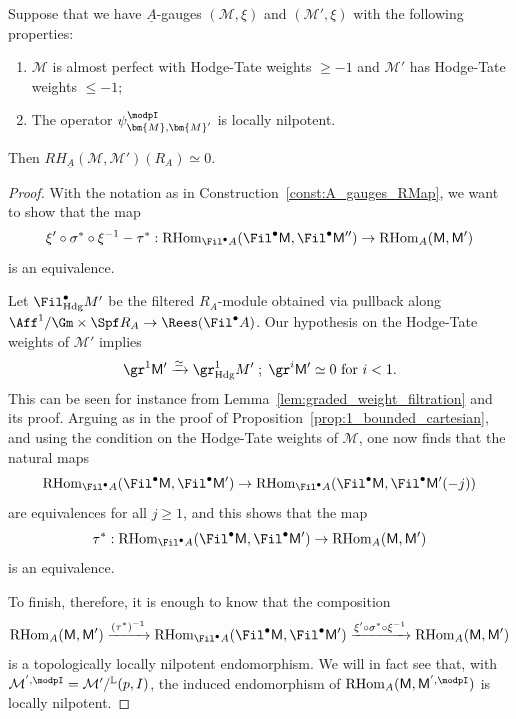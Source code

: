 \documentclass[10pt]{amsart}
\begin{document}
\begin{lemma}
\label{lem:A_gauge_nilpotent}
Suppose that we have $\underline{A}$-gauges $(\mathcal{M},\xi)$ and $(\mathcal{M}',\xi)$ with the following properties:
\begin{enumerate}
   \item $\mathcal{M}$ is almost perfect with Hodge-Tate weights $\ge -1$ and $\mathcal{M}'$ has Hodge-Tate weights $\leq -1$;
   \item The operator $\psi^\modpI_{\bm{M},\bm{M}'}$ is locally nilpotent.
\end{enumerate}
Then $RH_{\underline{A}}(\mathcal{M},\mathcal{M}')({R_A})\simeq 0$.
\end{lemma} 
\begin{proof}
With the notation as in Construction~\ref{const:A_gauges_RMap}, we want to show that the map
\[
\xi'\circ \sigma^*\circ \xi^{-1} - \tau^*:\mathrm{RHom}_{\Fil^\bullet A}(\Fil^\bullet \mathsf{M},\Fil^\bullet \mathsf{M}'')\to \mathrm{RHom}_{A}(\mathsf{M},\mathsf{M}')
\]
is an equivalence.


Let $\Fil^\bullet_{\mathrm{Hdg}}M'$ be the filtered $R_A$-module obtained via pullback along $\Aff^1/\Gm\times\Spf R_A \to \Rees(\Fil^\bullet A)$. Our hypothesis on the Hodge-Tate weights of $\mathcal{M}'$ implies
\[
\gr^{1}\mathsf{M}'\xrightarrow{\simeq} \gr^{1}_{\mathrm{Hdg}}M'\;;\; \gr^i\mathsf{M}'\simeq 0\text{ for $i<1$}.
\]
This can be seen for instance from Lemma~\ref{lem:graded_weight_filtration} and its proof. Arguing as in the proof of Proposition~\ref{prop:1_bounded_cartesian}, and using the condition on the Hodge-Tate weights of $\mathcal{M}$, one now finds that the natural maps
\[
\mathrm{RHom}_{\Fil^\bullet A}(\Fil^\bullet \mathsf{M},\Fil^\bullet \mathsf{M}')\to \mathrm{RHom}_{\Fil^\bullet A}(\Fil^\bullet \mathsf{M},\Fil^\bullet \mathsf{M}'(-j))
\]
are equivalences for all $j\ge 1$, and this shows that the map
\[
\tau^*:\mathrm{RHom}_{\Fil^\bullet A}(\Fil^\bullet \mathsf{M},\Fil^\bullet \mathsf{M}')\to \mathrm{RHom}_{A}(\mathsf{M},\mathsf{M}')
\]
is an equivalence.

To finish, therefore, it is enough to know that the composition
\[
\mathrm{RHom}_{A}(\mathsf{M},\mathsf{M}')\xrightarrow{(\tau^*)^{-1}}\mathrm{RHom}_{\Fil^\bullet A}(\Fil^\bullet \mathsf{M},\Fil^\bullet \mathsf{M}')\xrightarrow{\xi'\circ \sigma^*\circ \xi^{-1}}\mathrm{RHom}_{A}(\mathsf{M},\mathsf{M}')
\]
is a topologically locally nilpotent endomorphism. We will in fact see that, with $\mathcal{M}^{',\modpI} = \mathcal{M}'/{}^{\mathbb{L}}(p,I)$, the induced endomorphism of $\mathrm{RHom}_{A}(\mathsf{M},\mathsf{M}^{',\modpI})$ is locally nilpotent. 


\end{proof}
\end{document}
